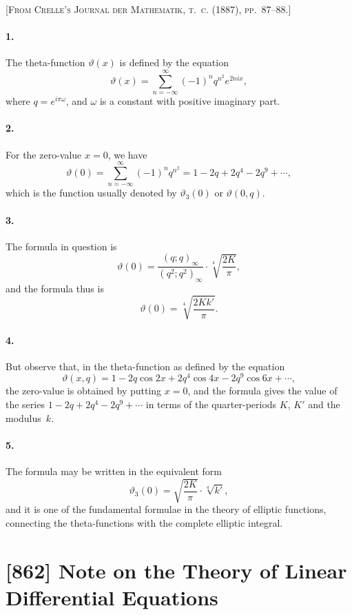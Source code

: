 \documentclass[11pt,a4paper]{article}
\theoremstyle{definition}
\begin{document}
\noindent\textsc{[From Crelle's Journal der Mathematik, t.~c. (1887), pp.~87--88.]}

\smallskip

\paragraph{1.} The theta-function $\vartheta(x)$ is defined by the equation
\[
\vartheta(x) = \sum_{n=-\infty}^{\infty} (-1)^{n} q^{n^{2}} e^{2nix},
\]
where $q = e^{i\pi\omega}$, and $\omega$ is a constant with positive imaginary part.

\paragraph{2.} For the zero-value $x = 0$, we have
\[
\vartheta(0) = \sum_{n=-\infty}^{\infty} (-1)^{n} q^{n^{2}} = 1 - 2q + 2q^{4} - 2q^{9} + \cdots,
\]
which is the function usually denoted by $\vartheta_{3}(0)$ or $\vartheta(0, q)$.

\paragraph{3.} The formula in question is
\[
\vartheta(0) = \frac{(q; q)_{\infty}}{(q^{2}; q^{2})_{\infty}} \cdot \sqrt[4]{\frac{2K}{\pi}},
\]
and the formula thus is
\[
\vartheta(0) = \sqrt[4]{\frac{2Kk'}{\pi}}.
\]

\paragraph{4.} But observe that, in the theta-function as defined by the equation
\[
\vartheta(x, q) = 1 - 2q\cos 2x + 2q^{4}\cos 4x - 2q^{9}\cos 6x + \cdots,
\]
the zero-value is obtained by putting $x = 0$, and the formula gives the value of the series $1 - 2q + 2q^{4} - 2q^{9} + \cdots$ in terms of the quarter-periods $K$, $K'$ and the modulus~$k$.

\paragraph{5.} The formula may be written in the equivalent form
\[
\vartheta_{3}(0) = \sqrt{\frac{2K}{\pi}} \cdot \sqrt[4]{k'},
\]
and it is one of the fundamental formulae in the theory of elliptic functions, connecting the theta-functions with the complete elliptic integral.

\newpage
\section*{[862] Note on the Theory of Linear Differential Equations}
\end{document}
